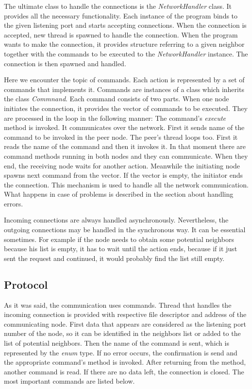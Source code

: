 The ultimate class to handle the connections is the
\textit{NetworkHandler} class. It provides all the necessary
functionality. Each instance of the program binds to the given listening
port and starts accepting connections. When the connection is accepted,
new thread is spawned to handle the connection. When the program wants
to make the connection, it provides structure referring to a given
neighbor together with the commands to be executed to the
\textit{NetworkHandler} instance. The connection is then spawned and
handled.

Here we encounter the topic of commands. Each action is represented by a
set of commands that implements it. Commands are instances of a class
which inherits the class \textit{Commnand}. Each command consists of two
parts. When one node initiates the connection, it provides the vector of
commands to be executed. They are processed in the loop in the following
manner: The command's \textit{execute} method is invoked. It
communicates over the network. First it sends name of the command to be
invoked in the peer node. The peer's thread loops too. First it reads
the name of the command and then it invokes it. In that moment there are
command methods running in both nodes and they can communicate. When
they end, the receiving node waits for another action. Meanwhile the
initiating node spawns next command from the vector. If the vector is
empty, the initiator ends the connection. This mechanism is used to
handle all the network communication. What happens in case of problems
is described in the section about handling errors.

Incoming connections are always handled asynchronously. Nevertheless,
the outgoing connections may be handled in the synchronous way. It can
be essential sometimes. For example if the node needs to obtain some
potential neighbors because his list is empty, it has to wait until the
action ends, because if it just sent the request and continued, it would
probably find the list still empty.

\subsection{Protocol}\label{protocol}

As it was said, the communication uses commands. Thread that handles the
incoming connection is provided with respective file descriptor and
address of the communicating node. First data that appears are
considered as the listening port number of the node, so it can be
identified in the neighbors list or added to the list of potential
neighbors. Then the name of the command is sent, which is represented by
the \textit{enum} type. If no error occurs, the confirmation is send and
the appropriate command's method is invoked. After returning from the
method, another command is read. If there are no data left, the
connection is closed. The most important commands are listed below.

